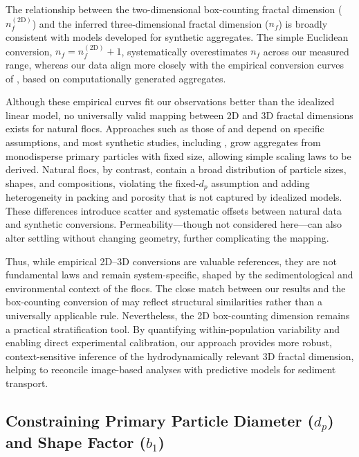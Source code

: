 \documentclass{agujournal2019}
\begin{document}
The relationship between the two-dimensional box-counting fractal dimension (\(n_f^{(2\mathrm{D})}\)) and the inferred three-dimensional fractal dimension (\(n_f\)) is broadly consistent with models developed for synthetic aggregates. The simple Euclidean conversion, \(n_f = n_f^{(2\mathrm{D})} + 1\), systematically overestimates \(n_f\) across our measured range, whereas our data align more closely with the empirical conversion curves of , based on computationally generated aggregates.

Although these empirical curves fit our observations better than the idealized linear model, no universally valid mapping between 2D and 3D fractal dimensions exists for natural flocs. Approaches such as those of  and  depend on specific assumptions, and most synthetic studies, including , grow aggregates from monodisperse primary particles with fixed size, allowing simple scaling laws to be derived. Natural flocs, by contrast, contain a broad distribution of particle sizes, shapes, and compositions, violating the fixed-\(d_p\) assumption and adding heterogeneity in packing and porosity that is not captured by idealized models. These differences introduce scatter and systematic offsets between natural data and synthetic conversions. Permeability—though not considered here—can also alter settling without changing geometry, further complicating the mapping.

Thus, while empirical 2D–3D conversions are valuable references, they are not fundamental laws and remain system-specific, shaped by the sedimentological and environmental context of the flocs. The close match between our results and the box-counting conversion of  may reflect structural similarities rather than a universally applicable rule. Nevertheless, the 2D box-counting dimension remains a practical stratification tool. By quantifying within-population variability and enabling direct experimental calibration, our approach provides more robust, context-sensitive inference of the hydrodynamically relevant 3D fractal dimension, helping to reconcile image-based analyses with predictive models for sediment transport.

\subsection{Constraining Primary Particle Diameter ($d_p$) and Shape Factor ($b_1$)}
\end{document}
